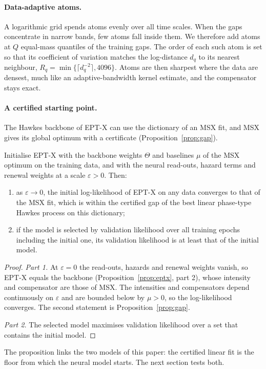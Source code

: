 \paragraph{Data-adaptive atoms.} A logarithmic grid spends atoms evenly over all time scales. When
the gaps concentrate in narrow bands, few atoms fall inside them. We therefore add atoms at $Q$
equal-mass quantiles of the training gaps. The order of each such atom is set so that its
coefficient of variation matches the log-distance $d_q$ to its nearest neighbour,
$R_q=\min\{\lceil d_q^{-2}\rceil,4096\}$. Atoms are then sharpest where the data are densest, much
like an adaptive-bandwidth kernel estimate, and the compensator stays exact.

\paragraph{A certified starting point.} The Hawkes backbone of EPT-X can use the dictionary of an
MSX fit, and MSX gives its global optimum with a certificate (Proposition~\ref{prop:gap}).

\begin{proposition}\label{prop:floor}
Initialise EPT-X with the backbone weights $\Theta$ and baselines $\mu$ of the MSX optimum on the
training data, and with the neural read-outs, hazard terms and renewal weights at a scale
$\varepsilon>0$. Then:
\begin{enumerate}
\item as $\varepsilon\to0$, the initial log-likelihood of EPT-X on any data converges to that of the
MSX fit, which is within the certified gap of the best linear phase-type Hawkes process on this
dictionary;
\item if the model is selected by validation likelihood over all training epochs including the
initial one, its validation likelihood is at least that of the initial model.
\end{enumerate}
\end{proposition}

\begin{proof}
\emph{Part 1.} At $\varepsilon=0$ the read-outs, hazards and renewal weights vanish, so EPT-X equals
the backbone (Proposition~\ref{prop:eptx}, part 2), whose intensity and compensator are those of
MSX. The intensities and compensators depend continuously on $\varepsilon$ and are bounded below by
$\mu>0$, so the log-likelihood converges. The second statement is Proposition~\ref{prop:gap}.

\emph{Part 2.} The selected model maximises validation likelihood over a set that contains the
initial model.
\end{proof}

The proposition links the two models of this paper: the certified linear fit is the floor from
which the neural model starts. The next section tests both.

